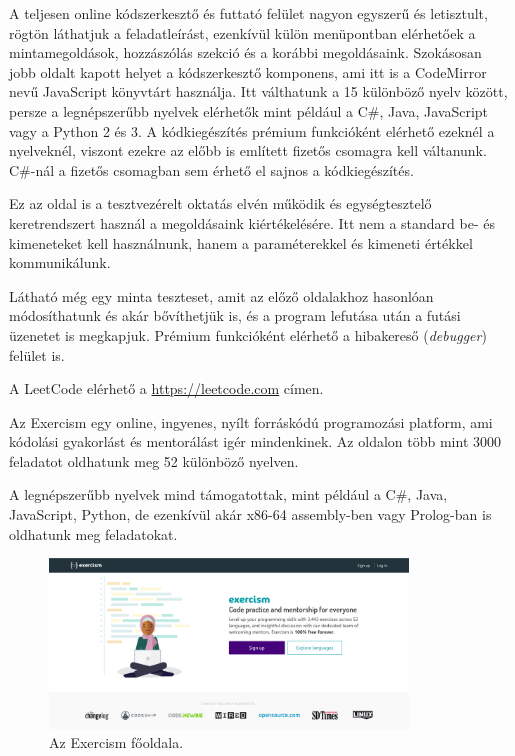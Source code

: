 A teljesen online kódszerkesztő és futtató felület nagyon egyszerű és letisztult, rögtön láthatjuk a feladatleírást, ezenkívül külön menüpontban elérhetőek a mintamegoldások, hozzászólás szekció és a korábbi megoldásaink. Szokásosan jobb oldalt kapott helyet a kódszerkesztő komponens, ami itt is a CodeMirror nevű JavaScript könyvtárt használja. Itt válthatunk a 15 különböző nyelv között, persze a legnépszerűbb nyelvek elérhetők mint például a C\#, Java, JavaScript vagy a Python 2 és 3. A kódkiegészítés prémium funkcióként elérhető ezeknél a nyelveknél, viszont ezekre az előbb is említett fizetős csomagra kell váltanunk. C\#-nál a fizetős csomagban sem érhető el sajnos a kódkiegészítés.

Ez az oldal is a tesztvezérelt oktatás elvén működik és egységtesztelő keretrendszert használ a megoldásaink kiértékelésére. Itt nem a standard be- és kimeneteket kell használnunk, hanem a paraméterekkel és kimeneti értékkel kommunikálunk.

Látható még egy minta teszteset, amit az előző oldalakhoz hasonlóan módosíthatunk és akár bővíthetjük is, és a program lefutása után a futási üzenetet is megkapjuk. Prémium funkcióként elérhető a hibakereső (\emph{debugger}) felület is.

A LeetCode elérhető a \url{https://leetcode.com} címen.


Az Exercism egy online, ingyenes, nyílt forráskódú programozási platform, ami kódolási gyakorlást és mentorálást igér mindenkinek. Az oldalon több mint 3000 feladatot oldhatunk meg 52 különböző nyelven. \cite{exercism}

A legnépszerűbb nyelvek mind támogatottak, mint például a C\#, Java, JavaScript, Python, de ezenkívül akár x86-64 assembly-ben vagy Prolog-ban is oldhatunk meg feladatokat.

\begin{figure}[h]
    \centering
    \includegraphics[width=0.85\textwidth]{images/exercism_homepage.png}
    \caption{Az Exercism főoldala.}
    \label{fig:exercism_homepage}
\end{figure}

